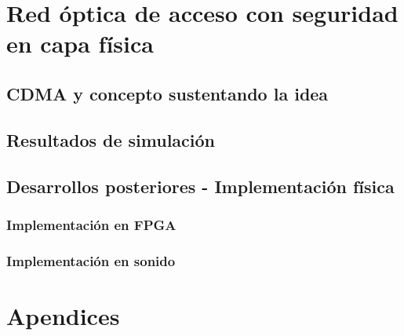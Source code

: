 \documentclass[a4paper,twoside,openright]{book}
\begin{document}







\part{Red óptica de acceso con seguridad en capa física}


\chapter{CDMA y concepto sustentando la idea}






\chapter{Resultados de simulación}

\chapter{Desarrollos posteriores - Implementación física}
\section{Implementación en FPGA}
\section{Implementación en sonido}


% 

\part{Apendices}
\appendix 


%
%
%
\end{document}
